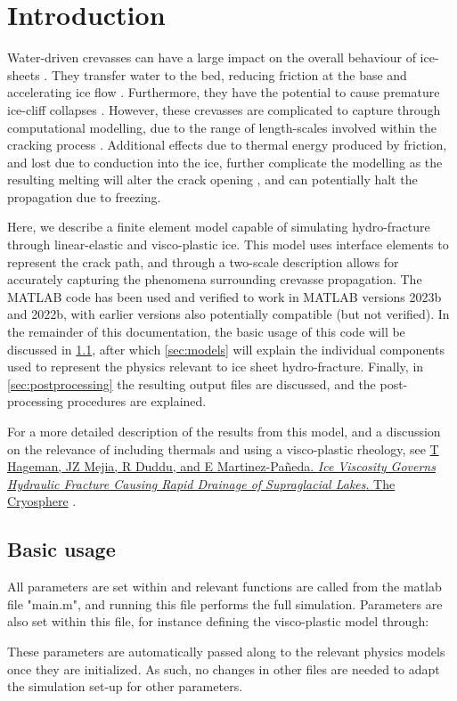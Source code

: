 \documentclass[3p]{elsarticle} %
\newcommand{\citeMe}{\href{https://doi.org/10.1016/j.cma.2023.116235}{T Hageman, JZ Mejia, R Duddu, and E {Martinez-Pa{\~n}eda}. \textit{Ice Viscosity Governs Hydraulic Fracture Causing Rapid Drainage of Supraglacial Lakes}. The Cryosphere} \citep{Hageman}}
\begin{document}
\newpage
\tableofcontents

\newpage
{}
\section{Introduction}
Water-driven crevasses can have a large impact on the overall behaviour of ice-sheets \citep{Boon2003,Phillips2010a,Poinar2021,Krawczynski2009}. They transfer water to the bed, reducing friction at the base and accelerating ice flow \citep{Fountain2005,Smith2015,Dow2015}. Furthermore, they have the potential to cause premature ice-cliff collapses \citep{Scambos2009,McGrath2012,Buck2023}. However, these crevasses are complicated to capture through computational modelling, due to the range of length-scales involved within the cracking process \citep{Rice2015}. Additional effects due to thermal energy produced by friction, and lost due to conduction into the ice, further complicate the modelling as the resulting melting will alter the crack opening \citep{Andrews2022}, and can potentially halt the propagation due to freezing. 

Here, we describe a finite element model capable of simulating hydro-fracture through linear-elastic and visco-plastic ice. This model uses interface elements to represent the crack path, and through a two-scale description allows for accurately capturing the phenomena surrounding crevasse propagation. The MATLAB code has been used and verified to work in MATLAB versions 2023b and 2022b, with earlier versions also potentially compatible (but not verified). In the remainder of this documentation, the basic usage of this code will be discussed in \cref{sec:usage}, after which \cref{sec:models} will explain the individual components used to represent the physics relevant to ice sheet hydro-fracture. Finally, in \cref{sec:postprocessing} the resulting output files are discussed, and the post-processing procedures are explained. 

For a more detailed description of the results from this model, and a discussion on the relevance of including thermals and using a visco-plastic rheology, see \citeMe{}.

\subsection{Basic usage}
\label{sec:usage}
All parameters are set within and relevant functions are called from the matlab file "main.m", and running this file performs the full simulation. Parameters are also set within this file, for instance defining the visco-plastic model through:

These parameters are automatically passed along to the relevant physics models once they are initialized. As such, no changes in other files are needed to adapt the simulation set-up for other parameters. 
\end{document}

